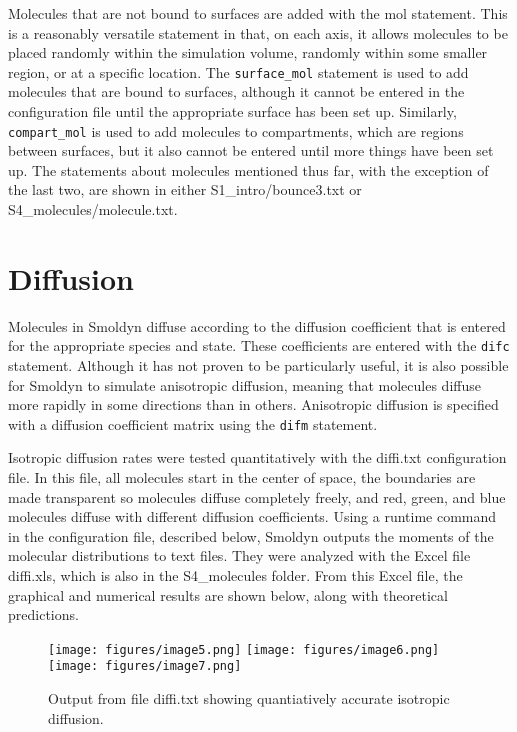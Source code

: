 \documentclass {scrbook}
\newcommand {\ttt} {\texttt}
\begin{document}
Molecules that are not bound to surfaces are added with the mol statement. This is a reasonably versatile statement in that, on each axis, it allows molecules to be placed randomly within the simulation volume, randomly within some smaller region, or at a specific location. The \ttt{surface\_mol} statement is used to add molecules that are bound to surfaces, although it cannot be entered in the configuration file until the appropriate surface has been set up. Similarly, \ttt{compart\_mol} is used to add molecules to compartments, which are regions between surfaces, but it also cannot be entered until more things have been set up. The statements about molecules mentioned thus far, with the exception of the last two, are shown in either S1\_intro/bounce3.txt or S4\_molecules/molecule.txt.

\section{Diffusion}

Molecules in Smoldyn diffuse according to the diffusion coefficient that is entered for the appropriate species and state. These coefficients are entered with the \ttt{difc} statement. Although it has not proven to be particularly useful, it is also possible for Smoldyn to simulate anisotropic diffusion, meaning that molecules diffuse more rapidly in some directions than in others. Anisotropic diffusion is specified with a diffusion coefficient matrix using the \ttt{difm} statement.

Isotropic diffusion rates were tested quantitatively with the diffi.txt configuration file. In this file, all molecules start in the center of space, the boundaries are made transparent so molecules diffuse completely freely, and red, green, and blue molecules diffuse with different diffusion coefficients. Using a runtime command in the configuration file, described below, Smoldyn outputs the moments of the molecular distributions to text files. They were analyzed with the Excel file diffi.xls, which is also in the S4\_molecules folder. From this Excel file, the graphical and numerical results are shown below, along with theoretical predictions.

\begin{figure}[h]
\centering
\texttt{[image: figures/image5.png]}
\texttt{[image: figures/image6.png]}
\texttt{[image: figures/image7.png]}
\caption{Output from file diffi.txt showing quantiatively accurate isotropic diffusion.}
\label{fig:diffi}
\end{figure}
\end{document}
